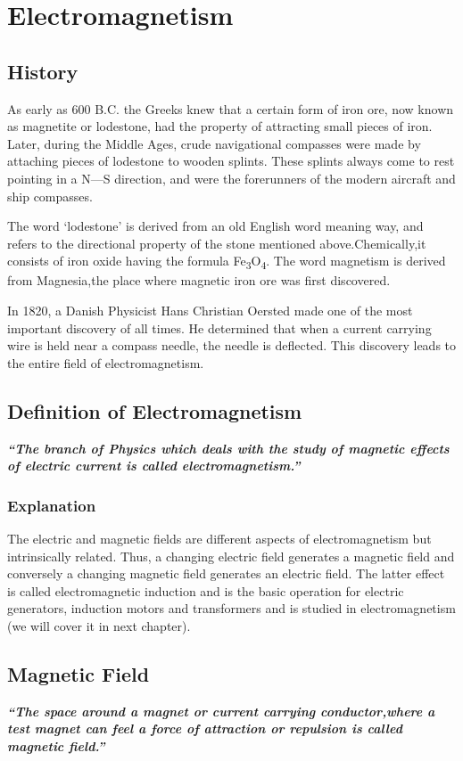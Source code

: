 \chapter{Electromagnetism}
\label{13}
\section{History}
As early as 600 B.C. the Greeks knew that a certain form of iron ore, now known as magnetite or lodestone, had the property of attracting small pieces of iron. Later, during the Middle Ages, crude navigational compasses were made by attaching pieces of lodestone to wooden splints. These splints always come to rest pointing in a N—S direction, and were the forerunners of the modern aircraft and ship compasses.

The word ‘lodestone’ is derived from an old English word meaning way, and refers to the directional property of the stone mentioned above.Chemically,it consists of iron oxide having the formula Fe\textsubscript{3}O\textsubscript{4}. The word magnetism is derived from Magnesia,the place where magnetic iron ore was first discovered.

In 1820, a Danish Physicist Hans Christian Oersted made one of the most important discovery of all times. He determined that when a current carrying wire is held near a compass needle, the needle is deflected. This discovery leads to the entire field of electromagnetism.

\section{Definition of Electromagnetism}
\textit{\textbf{“The branch of Physics which deals with the study of magnetic effects of electric current is called electromagnetism.”}}
\subsection*{Explanation}
The electric and magnetic fields are different aspects of electromagnetism but intrinsically related. Thus, a changing electric field generates a magnetic field and conversely  a changing magnetic field generates an electric field. The latter effect is called electromagnetic induction and is the basic operation for electric generators, induction motors and transformers and is studied in electromagnetism (we will cover it in next chapter).
\section{Magnetic Field}
\textit{\textbf{“The space around a magnet or current carrying conductor,where a test magnet can feel a force of attraction  or repulsion is called magnetic field.”}}
